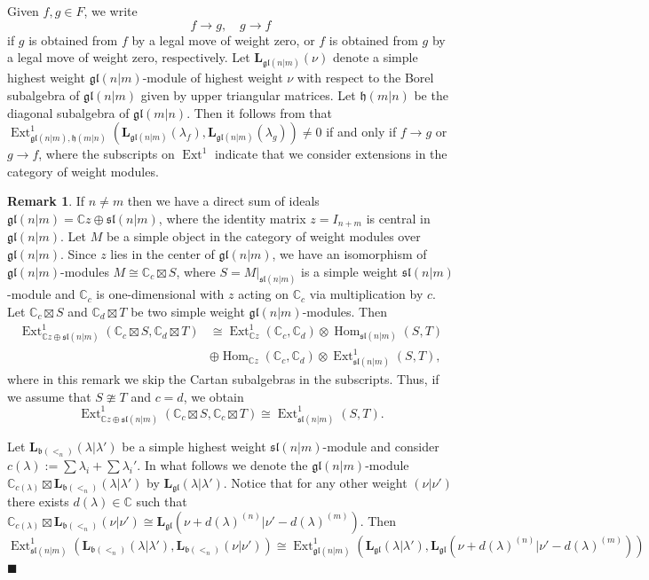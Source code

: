 \documentclass[12pt]{amsart}
\newcommand\C{\mathbb{C}}
\newcommand\fh{\mathfrak{h}}
\newcommand\fb{\mathfrak{b}}
\newcommand\fsl{\mathfrak{sl}}
\newcommand\fgl{\mathfrak{gl}}
\newcommand\bL{\mathbf{L}}
\DeclareMathOperator{\Hom}{Hom}
\DeclareMathOperator{\Ext}{Ext}
\theoremstyle{plain}
\theoremstyle{definition}
\newtheorem{rem}[theo]{Remark}
\numberwithin{equation}{section}
\newcommand\xqed[1]{%
  \leavevmode\unskip\penalty9999 \hbox{}\nobreak\hfill
  \quad\hbox{#1}}
\newcommand\demo{\xqed{$\blacksquare$}}
\begin{document}
Given $f,g\in F$, we write
	\[
f\to g,\quad g\to f
	\]
if $g$ is obtained from $f$ by a legal move of weight zero, or $f$ is obtained from $g$ by a legal move of weight zero, respectively. Let $\bL_{\fgl(n|m)}(\nu)$ denote a simple highest weight $\fgl(n|m)$-module of highest weight $\nu$ with respect to the Borel subalgebra of $\fgl(n|m)$ given by upper triangular matrices. Let $\fh(m|n)$ be the diagonal subalgebra of $\fgl(m|n)$. Then it follows from \cite[Theorem~B]{MS11} that $\Ext_{\fgl(n|m), \fh(m|n)}^1 (\bL_{\fgl(n|m)}(\lambda_f), \bL_{\fgl(n|m)}(\lambda_g))\neq 0$ if and only if $f\to g$ or $g\to f$, where the subscripts on $\Ext^1$ indicate that we consider extensions in the category of weight modules.

\begin{rem}\label{rem:reduction.to.gl(n|m)}
If $n\ne m$ then we have a direct sum of ideals $\fgl(n | m) =  \C z\oplus \fsl(n|m)$, where the identity matrix $z = I_{n+m}$ is central in $\fgl(n|m)$. Let $M$ be a simple object in the category of weight modules over $\fgl(n|m)$. Since $z$ lies in the center of $\fgl(n|m)$, we have an isomorphism of $\fgl(n|m)$-modules $M\cong \C_c\boxtimes S$, where $S = M|_{\fsl(n|m)}$ is a simple weight $\fsl(n|m)$-module and $\C_c$ is one-dimensional with $z$ acting on $\C_c$ via multiplication by $c$. Let $\C_c\boxtimes S$ and $\C_d\boxtimes T$ be two simple weight $\fgl(n|m)$-modules. Then
\begin{align*}
\Ext_{\C z\oplus \fsl(n|m)}^1(\C_c\boxtimes S, \C_d\boxtimes T)& \cong \Ext_{\C z}^1(\C_c, \C_d)\otimes \Hom_{\fsl(n|m)}(S,T) \\
& \oplus \Hom_{\C z}(\C_c, \C_d)\otimes \Ext_{\fsl(n|m)}^1(S,T),
\end{align*}
where in this remark we skip the Cartan subalgebras in the subscripts. Thus, if we assume that $S\ncong T$ and $c=d$, we obtain 
	\[
\Ext_{\C z\oplus \fsl(n|m)}^1(\C_c\boxtimes S, \C_c\boxtimes T) \cong  \Ext_{\fsl(n|m)}^1(S,T).
	\]

Let $\bL_{\fb(<_n)}(\lambda|\lambda')$ be a simple highest weight $\fsl(n|m)$-module and consider $c(\lambda) := \sum \lambda_i + \sum \lambda_i'$. In what follows we denote the $\fgl(n|m)$-module $\C_{c(\lambda)}\boxtimes \bL_{\fb(<_n)}(\lambda|\lambda')$ by $\bL_{\fgl}(\lambda|\lambda')$. Notice that for any other weight $(\nu|\nu')$ there exists $d(\lambda)\in \C$ such that $\C_{c(\lambda)}\boxtimes \bL_{\fb(<_n)}(\nu|\nu')\cong \bL_{\fgl}(\nu + d(\lambda)^{(n)}| \nu'-d(\lambda)^{(m)})$. Then
	\[
\Ext_{\fsl(n|m)}^1 (\bL_{\fb(<_n)}(\lambda|\lambda'), \bL_{\fb(<_n)}(\nu|\nu')) \cong \Ext_{\fgl(n|m)}^1(\bL_{\fgl}(\lambda|\lambda'), \bL_{\fgl}(\nu + d(\lambda)^{(n)}| \nu'-d(\lambda)^{(m)}))
	\]
\demo
\end{rem}
\end{document}
